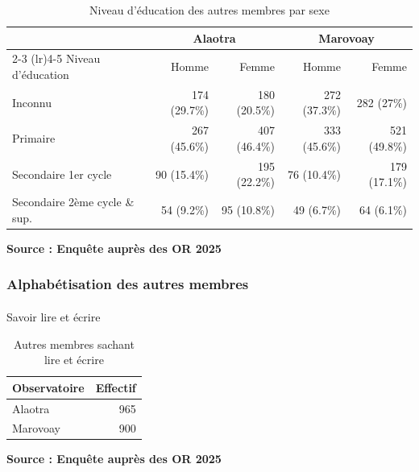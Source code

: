 \documentclass[
  french,
  letterpaper,
]{report}
\makeatletter
\let\oldparagraph\paragraph
\renewcommand{\paragraph}{
    \@ifstar
      \xxxParagraphStar
      \xxxParagraphNoStar
  }
\newcommand{\xxxParagraphStar}[1]{\oldparagraph*{#1}\mbox{}}
\newcommand{\xxxParagraphNoStar}[1]{\oldparagraph{#1}\mbox{}}
\makeatother
\begin{document}
\begin{table}
\caption*{
{\fontsize{20}{25}\selectfont  Niveau d'éducation des autres membres par sexe\fontsize{12}{15}\selectfont }
} 
\fontsize{12.0pt}{14.0pt}\selectfont
\begin{tabular*}{\linewidth}{@{\extracolsep{\fill}}lrrrr}
\toprule
 & \multicolumn{2}{c}{Alaotra} & \multicolumn{2}{c}{Marovoay} \\ 
\cmidrule(lr){2-3} \cmidrule(lr){4-5}
Niveau d'éducation & Homme & Femme & Homme & Femme \\ 
\midrule\addlinespace[2.5pt]
Inconnu & 174 (29.7\%) & 180 (20.5\%) & 272 (37.3\%) & 282 (27\%) \\ 
Primaire & 267 (45.6\%) & 407 (46.4\%) & 333 (45.6\%) & 521 (49.8\%) \\ 
Secondaire 1er cycle & 90 (15.4\%) & 195 (22.2\%) & 76 (10.4\%) & 179 (17.1\%) \\ 
Secondaire 2ème cycle \& sup. & 54 (9.2\%) & 95 (10.8\%) & 49 (6.7\%) & 64 (6.1\%) \\ 
\bottomrule
\end{tabular*}
\begin{minipage}{\linewidth}
\textbf{Source : Enquête auprès des OR 2025}\\
\end{minipage}
\end{table}

\subsubsection{Alphabétisation des autres
membres}\label{alphabuxe9tisation-des-autres-membres}

\paragraph{Savoir lire et écrire}\label{savoir-lire-et-uxe9crire-1}

\begin{table}
\caption*{
{\fontsize{20}{25}\selectfont  Autres membres sachant lire et écrire\fontsize{12}{15}\selectfont }
} 
\fontsize{12.0pt}{14.0pt}\selectfont
\begin{tabular*}{\linewidth}{@{\extracolsep{\fill}}lr}
\toprule
Observatoire & Effectif \\ 
\midrule\addlinespace[2.5pt]
Alaotra & 965 \\ 
Marovoay & 900 \\ 
\bottomrule
\end{tabular*}
\begin{minipage}{\linewidth}
\textbf{Source : Enquête auprès des OR 2025}\\
\end{minipage}
\end{table}
\end{document}
